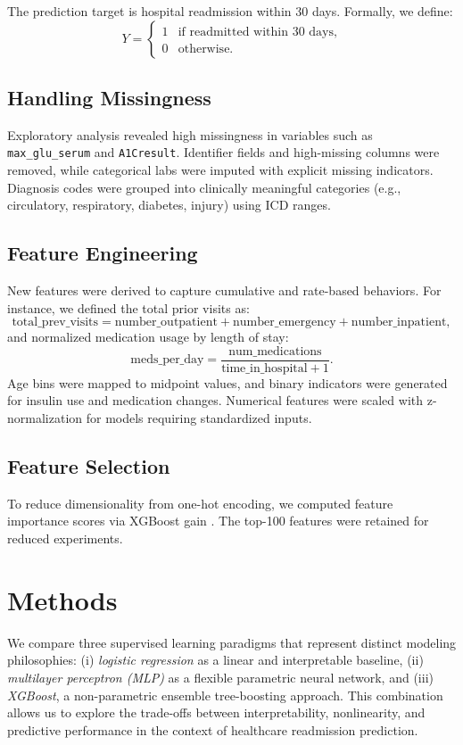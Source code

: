 \documentclass{article}
\begin{document}
The prediction target is hospital readmission within 30 days. Formally, we define:
\[
Y = \begin{cases}
1 & \text{if readmitted within 30 days}, \\
0 & \text{otherwise}.
\end{cases}
\]

\subsection{Handling Missingness}
Exploratory analysis revealed high missingness in variables such as \texttt{max\_glu\_serum} and \texttt{A1Cresult}. Identifier fields and high-missing columns were removed, while categorical labs were imputed with explicit missing indicators. Diagnosis codes were grouped into clinically meaningful categories (e.g., circulatory, respiratory, diabetes, injury) using ICD ranges.

\subsection{Feature Engineering}
New features were derived to capture cumulative and rate-based behaviors. For instance, we defined the total prior visits as:
\[
\text{total\_prev\_visits} = \text{number\_outpatient} + \text{number\_emergency} + \text{number\_inpatient},
\]
and normalized medication usage by length of stay:
\[
\text{meds\_per\_day} = \frac{\text{num\_medications}}{\text{time\_in\_hospital}+1}.
\]
Age bins were mapped to midpoint values, and binary indicators were generated for insulin use and medication changes. Numerical features were scaled with z-normalization for models requiring standardized inputs.

\subsection{Feature Selection}
To reduce dimensionality from one-hot encoding, we computed feature importance scores via XGBoost gain \cite{chen2016xgboost}. The top-100 features were retained for reduced experiments.


\section{Methods}
We compare three supervised learning paradigms that represent distinct modeling philosophies: (i) \emph{logistic regression} as a linear and interpretable baseline, (ii) \emph{multilayer perceptron (MLP)} as a flexible parametric neural network, and (iii) \emph{XGBoost}, a non-parametric ensemble tree-boosting approach. This combination allows us to explore the trade-offs between interpretability, nonlinearity, and predictive performance in the context of healthcare readmission prediction.
\end{document}
